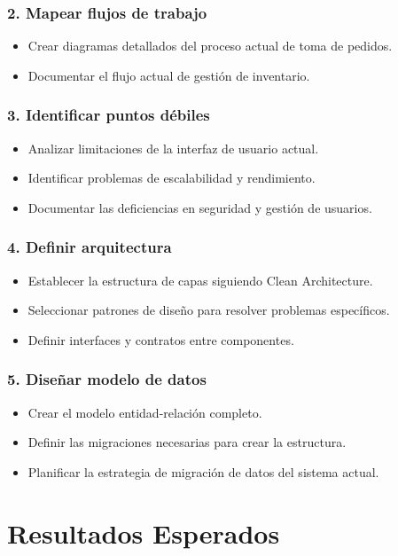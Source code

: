 \documentclass[12pt]{article}
\begin{document}
\subsubsection{2. Mapear flujos de trabajo}
\begin{itemize}
  \item Crear diagramas detallados del proceso actual de toma de pedidos.
  \item Documentar el flujo actual de gestión de inventario.
\end{itemize}

\subsubsection{3. Identificar puntos débiles}
\begin{itemize}
  \item Analizar limitaciones de la interfaz de usuario actual.
  \item Identificar problemas de escalabilidad y rendimiento.
  \item Documentar las deficiencias en seguridad y gestión de usuarios.
\end{itemize}

\subsubsection{4. Definir arquitectura}
\begin{itemize}
  \item Establecer la estructura de capas siguiendo Clean Architecture.
  \item Seleccionar patrones de diseño para resolver problemas específicos.
  \item Definir interfaces y contratos entre componentes.
\end{itemize}

\subsubsection{5. Diseñar modelo de datos}
\begin{itemize}
  \item Crear el modelo entidad-relación completo.
  \item Definir las migraciones necesarias para crear la estructura.
  \item Planificar la estrategia de migración de datos del sistema actual.
\end{itemize}

\section{Resultados Esperados}
\end{document}
